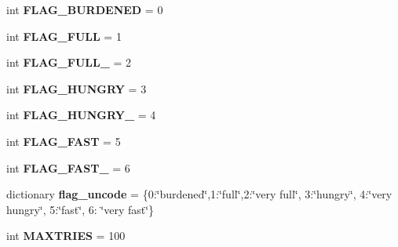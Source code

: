 \begin{DoxyCompactItemize}
\item 
\hypertarget{namespaceconstants_ab50bbb24fb0b8f5d2b62cf97c8ae3f95}{}int {\bfseries F\+L\+A\+G\+\_\+\+B\+U\+R\+D\+E\+N\+E\+D} = 0\label{namespaceconstants_ab50bbb24fb0b8f5d2b62cf97c8ae3f95}

\item 
\hypertarget{namespaceconstants_a4fd1ef34d9b902cf4386539348595c5b}{}int {\bfseries F\+L\+A\+G\+\_\+\+F\+U\+L\+L} = 1\label{namespaceconstants_a4fd1ef34d9b902cf4386539348595c5b}

\item 
\hypertarget{namespaceconstants_a94feecc4b64ec2b63c99bfb4031e85b8}{}int {\bfseries F\+L\+A\+G\+\_\+\+F\+U\+L\+L\+\_} = 2\label{namespaceconstants_a94feecc4b64ec2b63c99bfb4031e85b8}

\item 
\hypertarget{namespaceconstants_a8c95e460963ecf79096c74a5831b7723}{}int {\bfseries F\+L\+A\+G\+\_\+\+H\+U\+N\+G\+R\+Y} = 3\label{namespaceconstants_a8c95e460963ecf79096c74a5831b7723}

\item 
\hypertarget{namespaceconstants_ac9aba9bb8e6618e5fdfef3879398586f}{}int {\bfseries F\+L\+A\+G\+\_\+\+H\+U\+N\+G\+R\+Y\+\_} = 4\label{namespaceconstants_ac9aba9bb8e6618e5fdfef3879398586f}

\item 
\hypertarget{namespaceconstants_a7409aec475529a6d50549ddfa2de579f}{}int {\bfseries F\+L\+A\+G\+\_\+\+F\+A\+S\+T} = 5\label{namespaceconstants_a7409aec475529a6d50549ddfa2de579f}

\item 
\hypertarget{namespaceconstants_a0338d374252f6186651b01b0f13dda62}{}int {\bfseries F\+L\+A\+G\+\_\+\+F\+A\+S\+T\+\_} = 6\label{namespaceconstants_a0338d374252f6186651b01b0f13dda62}

\item 
\hypertarget{namespaceconstants_a8bee061f30ac8275372eb00d04fbe980}{}dictionary {\bfseries flag\+\_\+uncode} = \{0\+:\char`\"{}burdened\char`\"{},1\+:\char`\"{}full\char`\"{},2\+:\char`\"{}very full\char`\"{}, 3\+:\char`\"{}hungry\char`\"{}, 4\+:\char`\"{}very hungry\char`\"{}, 5\+:\char`\"{}fast\char`\"{}, 6\+: \char`\"{}very fast\char`\"{}\}\label{namespaceconstants_a8bee061f30ac8275372eb00d04fbe980}

\item 
\hypertarget{namespaceconstants_a1dc8e7ed710dde3bc77e165417976351}{}int {\bfseries M\+A\+X\+T\+R\+I\+E\+S} = 100\label{namespaceconstants_a1dc8e7ed710dde3bc77e165417976351}

\end{DoxyCompactItemize}


